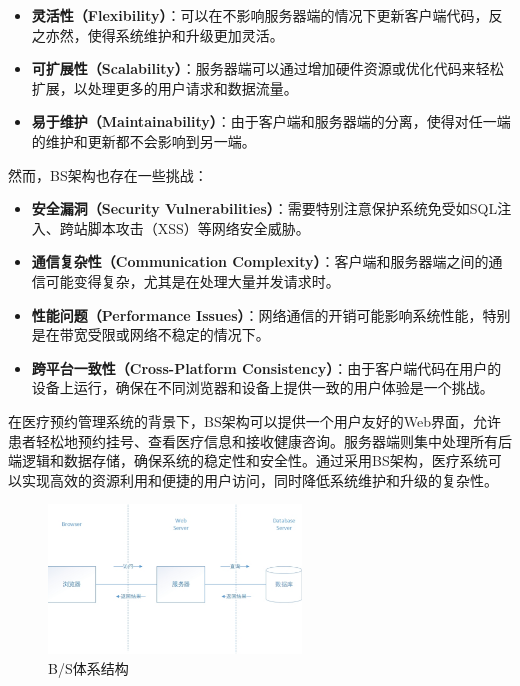 \begin{itemize}
	\item \textbf{灵活性（Flexibility）}：可以在不影响服务器端的情况下更新客户端代码，反之亦然，使得系统维护和升级更加灵活。
	
	\item \textbf{可扩展性（Scalability）}：服务器端可以通过增加硬件资源或优化代码来轻松扩展，以处理更多的用户请求和数据流量。
	
	\item \textbf{易于维护（Maintainability）}：由于客户端和服务器端的分离，使得对任一端的维护和更新都不会影响到另一端。
\end{itemize}

然而，BS架构也存在一些挑战：

\begin{itemize}
	\item \textbf{安全漏洞（Security Vulnerabilities）}：需要特别注意保护系统免受如SQL注入、跨站脚本攻击（XSS）等网络安全威胁。
	
	\item \textbf{通信复杂性（Communication Complexity）}：客户端和服务器端之间的通信可能变得复杂，尤其是在处理大量并发请求时。
	
	\item \textbf{性能问题（Performance Issues）}：网络通信的开销可能影响系统性能，特别是在带宽受限或网络不稳定的情况下。
	
	\item \textbf{跨平台一致性（Cross-Platform Consistency）}：由于客户端代码在用户的设备上运行，确保在不同浏览器和设备上提供一致的用户体验是一个挑战。
\end{itemize}

在医疗预约管理系统的背景下，BS架构可以提供一个用户友好的Web界面，允许患者轻松地预约挂号、查看医疗信息和接收健康咨询。服务器端则集中处理所有后端逻辑和数据存储，确保系统的稳定性和安全性。通过采用BS架构，医疗系统可以实现高效的资源利用和便捷的用户访问，同时降低系统维护和升级的复杂性。

\begin{figure}[htbp]
	\centering
	\includegraphics[width=0.6\textwidth]{figures/15.png}
	\caption{B/S体系结构}
\end{figure}


